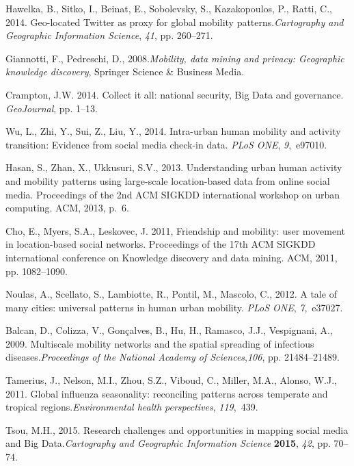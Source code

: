 \documentclass{elsart}
\begin{document}
\begin{thebibliography}{00}
Hawelka, B., Sitko, I., Beinat, E., Sobolevsky, S., Kazakopoulos, P., Ratti, C., 2014. Geo-located Twitter as proxy for global mobility patterns.{\em Cartography and Geographic Information Science}, {\em
  41}, pp. 260--271.

Giannotti, F., Pedreschi, D., 2008.{\em Mobility, data mining and privacy: Geographic knowledge discovery}, Springer Science \& Business Media.

Crampton, J.W. 2014. Collect it all: national security, Big Data and governance. {\em GeoJournal}, pp. 1--13.

Wu, L., Zhi, Y., Sui, Z., Liu, Y., 2014. Intra-urban human mobility and activity transition: Evidence from social media check-in data. {\em PLoS ONE}, {\em 9},~e97010.

Hasan, S., Zhan, X., Ukkusuri, S.V., 2013. Understanding urban human activity and mobility patterns using large-scale location-based data from online social media. Proceedings of the 2nd ACM SIGKDD international workshop on urban computing. ACM,  2013, p.~6.

Cho, E., Myers, S.A., Leskovec, J. 2011, Friendship and mobility: user movement in location-based social networks. Proceedings of the 17th ACM SIGKDD international conference on Knowledge discovery and data mining. ACM,  2011, pp. 1082--1090.

Noulas, A., Scellato, S., Lambiotte, R., Pontil, M., Mascolo, C., 2012. A tale of many cities: universal patterns in human urban mobility. {\em PLoS ONE}, {\em 7},~e37027.

Balcan, D., Colizza, V., Gon{\c{c}}alves, B., Hu, H., Ramasco, J.J.,
  Vespignani, A., 2009. Multiscale mobility networks and the spatial spreading of infectious diseases.{\em Proceedings of the National Academy of Sciences},{\em 106}, pp. 21484--21489.

Tamerius, J., Nelson, M.I., Zhou, S.Z., Viboud, C., Miller, M.A., Alonso, W.J., 2011. Global influenza seasonality: reconciling patterns across temperate and tropical regions.{\em Environmental health perspectives}, {\em 119},~439.

Tsou, M.H., 2015. Research challenges and opportunities in mapping social media and Big Data.{\em Cartography and Geographic Information Science} {\bf 2015}, {\em 42}, pp. 70--74.


\end{thebibliography}
\end{document}
